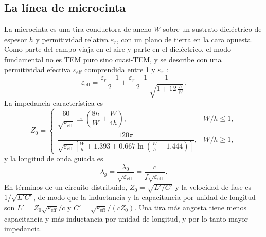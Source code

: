 \subsection{La línea de microcinta}
La microcinta es una tira conductora de ancho $W$ sobre un sustrato dieléctrico de espesor $h$ y permitividad relativa $\varepsilon_r$, con un plano de tierra en la cara opuesta. Como parte del campo viaja en el aire y parte en el dieléctrico, el modo fundamental no es TEM puro sino cuasi-TEM, y se describe con una permitividad efectiva $\varepsilon_{\mathrm{eff}}$ comprendida entre 1 y $\varepsilon_r$ \cite{pozar}:
\begin{equation}
\varepsilon_{\mathrm{eff}} = \frac{\varepsilon_r+1}{2} + \frac{\varepsilon_r-1}{2}\,\frac{1}{\sqrt{1+12\,\frac{h}{W}}}.
\label{eq:eeff}
\end{equation}
La impedancia característica es
\begin{equation}
Z_0 =
\begin{cases}
\dfrac{60}{\sqrt{\varepsilon_{\mathrm{eff}}}}\ln\!\left(\dfrac{8h}{W}+\dfrac{W}{4h}\right), & W/h\leq 1,\\[12pt]
\dfrac{120\pi}{\sqrt{\varepsilon_{\mathrm{eff}}}\left[\frac{W}{h}+1.393+0.667\ln\!\left(\frac{W}{h}+1.444\right)\right]}, & W/h\geq 1,
\end{cases}
\label{eq:z0}
\end{equation}
y la longitud de onda guiada es
\begin{equation}
\lambda_g = \frac{\lambda_0}{\sqrt{\varepsilon_{\mathrm{eff}}}} = \frac{c}{f\sqrt{\varepsilon_{\mathrm{eff}}}}.
\label{eq:lg}
\end{equation}
En términos de un circuito distribuido, $Z_0=\sqrt{L'/C'}$ y la velocidad de fase es $1/\sqrt{L'C'}$, de modo que la inductancia y la capacitancia por unidad de longitud son $L'=Z_0\sqrt{\varepsilon_{\mathrm{eff}}}/c$ y $C'=\sqrt{\varepsilon_{\mathrm{eff}}}/(cZ_0)$. Una tira más angosta tiene menos capacitancia y más inductancia por unidad de longitud, y por lo tanto mayor impedancia.

